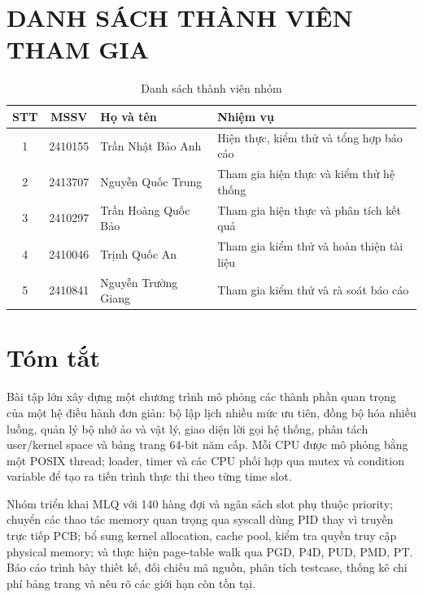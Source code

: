 \documentclass[12pt,a4paper]{article}
\begin{document}
\newpage
{}
\setcounter{page}{1}
\section*{DANH SÁCH THÀNH VIÊN THAM GIA}
\begin{table}[H]
\centering
\setlength{\tabcolsep}{5pt}
\renewcommand{\arraystretch}{1.5}
\small
\begin{tabular}{|c|c|p{4.7cm}|p{6.5cm}|}
\hline
\textbf{STT} & \textbf{MSSV} & \centering\textbf{Họ và tên} &
\centering\arraybackslash\textbf{Nhiệm vụ}\\
\hline
1 & 2410155 & Trần Nhật Bảo Anh & Hiện thực, kiểm thử và tổng hợp báo cáo\\
\hline
2 & 2413707 & Nguyễn Quốc Trung & Tham gia hiện thực và kiểm thử hệ thống\\
\hline
3 & 2410297 & Trần Hoàng Quốc Bảo & Tham gia hiện thực và phân tích kết quả\\
\hline
4 & 2410046 & Trịnh Quốc An & Tham gia kiểm thử và hoàn thiện tài liệu\\
\hline
5 & 2410841 & Nguyễn Trường Giang & Tham gia kiểm thử và rà soát báo cáo\\
\hline
\end{tabular}
\caption{Danh sách thành viên nhóm}
\end{table}

\vfill
\newpage

\tableofcontents
\newpage
\listoffigures
\listoftables
\newpage

\section*{Tóm tắt}
Bài tập lớn xây dựng một chương trình mô phỏng các thành phần quan trọng của một hệ
điều hành đơn giản: bộ lập lịch nhiều mức ưu tiên, đồng bộ hóa nhiều luồng, quản lý bộ
nhớ ảo và vật lý, giao diện lời gọi hệ thống, phân tách user/kernel space và bảng trang
64-bit năm cấp. Mỗi CPU được mô phỏng bằng một POSIX thread; loader, timer và các CPU
phối hợp qua mutex và condition variable để tạo ra tiến trình thực thi theo từng time
slot.

Nhóm triển khai MLQ với 140 hàng đợi và ngân sách slot phụ thuộc priority; chuyển các
thao tác memory quan trọng qua syscall dùng PID thay vì truyền trực tiếp PCB; bổ sung
kernel allocation, cache pool, kiểm tra quyền truy cập physical memory; và thực hiện
page-table walk qua PGD, P4D, PUD, PMD, PT. Báo cáo trình bày thiết kế, đối chiếu mã
nguồn, phân tích testcase, thống kê chi phí bảng trang và nêu rõ các giới hạn còn tồn tại.
\end{document}
